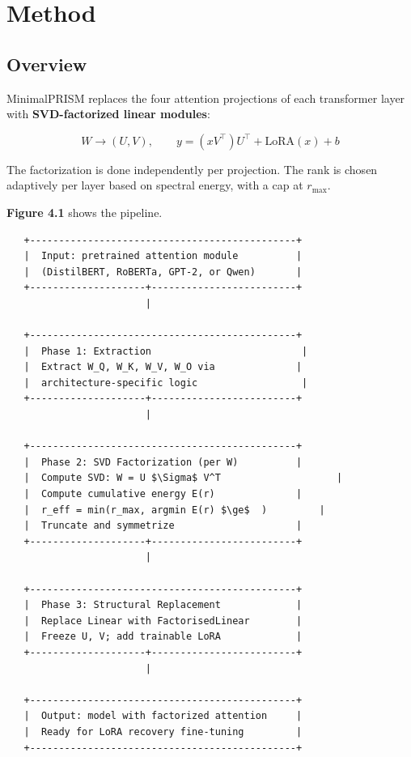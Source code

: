 
\section{Method}

\subsection{Overview}

MinimalPRISM replaces the four attention projections of each transformer 
layer with \textbf{SVD-factorized linear modules}:

\[
W \to (U, V), \qquad
y = (x V^\top) U^\top + \text{LoRA}(x) + b
\tag{4.1}
\]

The factorization is done independently per projection. The rank is chosen 
adaptively per layer based on spectral energy, with a cap at $r_\text{max}$.

\textbf{Figure 4.1} shows the pipeline.

\begin{lstlisting}
   +----------------------------------------------+
   |  Input: pretrained attention module          |
   |  (DistilBERT, RoBERTa, GPT-2, or Qwen)       |
   +--------------------+-------------------------+
                        |
                         
   +----------------------------------------------+
   |  Phase 1: Extraction                          |
   |  Extract W_Q, W_K, W_V, W_O via              |
   |  architecture-specific logic                  |
   +--------------------+-------------------------+
                        |
                         
   +----------------------------------------------+
   |  Phase 2: SVD Factorization (per W)          |
   |  Compute SVD: W = U $\Sigma$ V^T                    |
   |  Compute cumulative energy E(r)              |
   |  r_eff = min(r_max, argmin E(r) $\ge$  )         |
   |  Truncate and symmetrize                     |
   +--------------------+-------------------------+
                        |
                         
   +----------------------------------------------+
   |  Phase 3: Structural Replacement             |
   |  Replace Linear with FactorisedLinear        |
   |  Freeze U, V; add trainable LoRA             |
   +--------------------+-------------------------+
                        |
                         
   +----------------------------------------------+
   |  Output: model with factorized attention     |
   |  Ready for LoRA recovery fine-tuning         |
   +----------------------------------------------+
\end{lstlisting}


